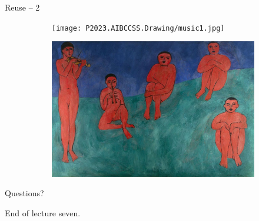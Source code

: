 \documentclass{beamer}
\begin{document}
\begin{frame}
{\centerline{Reuse -- 2}}

\begin{figure}
\centering
\begin{subfigure}{.5\textwidth}
  \centering
  \texttt{[image: P2023.AIBCCSS.Drawing/music1.jpg]}
\end{subfigure}%
\begin{subfigure}{.5\textwidth}
  \centering
  \includegraphics[width=0.95\linewidth]{P2023.AIBCCSS.Drawing/music.jpg}
\end{subfigure}
\end{figure}

\end{frame}


\begin{frame}
{\centerline{Questions?}}
\vspace{1cm}
\begin{center}
    \LARGE{End of lecture seven.}
\end{center}

\end{frame}
\end{document}
